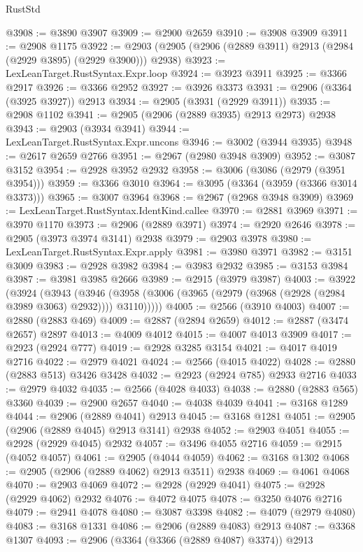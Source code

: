 \begin{lexlean}{RustStd}
\begin{coremodule}
@3908 := @3890 @3907
@3909 := @2900 @2659
@3910 := @3908 @3909
@3911 := @2908 @1175
@3922 := @2903 (@2905 (@2906 (@2889 @3911) @2913 (@2984 (@2929 @3895) (@2929 @3900))) @2938)
@3923 := LexLeanTarget.RustSyntax.Expr.loop
@3924 := @3923 @3911
@3925 := @3366 @2917
@3926 := @3366 @2952
@3927 := @3926 @3373
@3931 := @2906 (@3364 (@3925 @3927)) @2913
@3934 := @2905 (@3931 (@2929 @3911))
@3935 := @2908 @1102
@3941 := @2905 (@2906 (@2889 @3935) @2913 @2973) @2938
@3943 := @2903 (@3934 @3941)
@3944 := LexLeanTarget.RustSyntax.Expr.uncons
@3946 := @3002 (@3944 @3935)
@3948 := @2617 @2659 @2766
@3951 := @2967 (@2980 @3948 @3909)
@3952 := @3087 @3152
@3954 := @2928 @3952 @2932
@3958 := @3006 (@3086 (@2979 (@3951 @3954)))
@3959 := @3366 @3010
@3964 := @3095 (@3364 (@3959 (@3366 @3014 @3373)))
@3965 := @3007 @3964
@3968 := @2967 (@2968 @3948 @3909)
@3969 := LexLeanTarget.RustSyntax.IdentKind.callee
@3970 := @2881 @3969
@3971 := @3970 @1170
@3973 := @2906 (@2889 @3971)
@3974 := @2920 @2646
@3978 := @2905 (@3973 @3974 @3141) @2938
@3979 := @2903 @3978
@3980 := LexLeanTarget.RustSyntax.Expr.apply
@3981 := @3980 @3971
@3982 := @3151 @3009
@3983 := @2928 @3982
@3984 := @3983 @2932
@3985 := @3153 @3984
@3987 := @3981 @3985 @2666
@3989 := @2915 (@3979 @3987)
@4003 := @3922
    (@3924
      (@3943
        (@3946 (@3958 (@3006 (@3965 (@2979 (@3968 (@2928 (@2984 @3989 @3063) @2932)))) @3110)))))
@4005 := @2566 (@3910 @4003)
@4007 := @2880 (@2883 @469)
@4009 := @2887 (@2894 @2659)
@4012 := @2887 (@3474 @2657) @2897
@4013 := @4009 @4012
@4015 := @4007 @4013 @3909
@4017 := @2923 (@2924 @777)
@4019 := @2928 @3285 @3154
@4021 := @4017 @4019 @2716
@4022 := @2979 @4021
@4024 := @2566 (@4015 @4022)
@4028 := @2880 (@2883 @513) @3426 @3428
@4032 := @2923 (@2924 @785) @2933 @2716
@4033 := @2979 @4032
@4035 := @2566 (@4028 @4033)
@4038 := @2880 (@2883 @565) @3360
@4039 := @2900 @2657
@4040 := @4038 @4039
@4041 := @3168 @1289
@4044 := @2906 (@2889 @4041) @2913
@4045 := @3168 @1281
@4051 := @2905 (@2906 (@2889 @4045) @2913 @3141) @2938
@4052 := @2903 @4051
@4055 := @2928 (@2929 @4045) @2932
@4057 := @3496 @4055 @2716
@4059 := @2915 (@4052 @4057)
@4061 := @2905 (@4044 @4059)
@4062 := @3168 @1302
@4068 := @2905 (@2906 (@2889 @4062) @2913 @3511) @2938
@4069 := @4061 @4068
@4070 := @2903 @4069
@4072 := @2928 (@2929 @4041)
@4075 := @2928 (@2929 @4062) @2932
@4076 := @4072 @4075
@4078 := @3250 @4076 @2716
@4079 := @2941 @4078
@4080 := @3087 @3398
@4082 := @4079 (@2979 @4080)
@4083 := @3168 @1331
@4086 := @2906 (@2889 @4083) @2913
@4087 := @3368 @1307
@4093 := @2906 (@3364 (@3366 (@2889 @4087) @3374)) @2913

\end{coremodule}
\end{lexlean}
